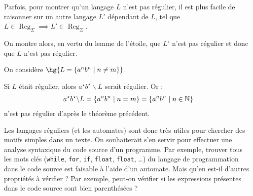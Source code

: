 \documentclass[a4paper,french,bookmarks]{book}
\DeclareMathOperator{\Reg}{Reg}
\begin{document}
    Parfois, pour montrer qu'un langage $L$ n'est pas régulier, il est plus facile de raisonner sur un autre langage $L'$ dépendant de $L$, tel que $L \in \Reg_\Sigma \implies L' \in \Reg_\Sigma$.
    
    On montre alors, en vertu du lemme de l'étoile, que $L'$ n'est pas régulier et donc que $L$ n'est pas régulier.
    \begin{example}{}{}
        On considère $\hg{L = \ens{a^nb^n \enstq n \neq m}}$.
        
        Si $L$ était régulier, alors $a^\star b^\star \backslash L$ serait régulier. Or :
        \[ a^\star b^\star \backslash L = \left\{a^nb^n \;\middle\vert\; n = m\right\} = \left\{a^nb^n \;\middle\vert\; n \in \mathbb{N}\right\}\]
        n'est pas régulier d'après le théorème précédent.
    \end{example}
    
    Les langages réguliers (et les automates) sont donc très utiles pour chercher des motifs simples dans un texte. On souhaiterait s'en servir pour effectuer une analyse syntaxique du code source d'un programme. Par exemple, trouver tous les mots clés (\texttt{while}, \texttt{for}, \texttt{if}, \texttt{float}, \texttt{float}, \dots) du langage de programmation dans le code source est faisable à l'aide d'un automate. Mais qu'en est-il d'autres propriétés à vérifier ? Par exemple, peut-on vérifier si les expressions présentes dans le code source sont bien parenthésées ?
    
\end{document}
